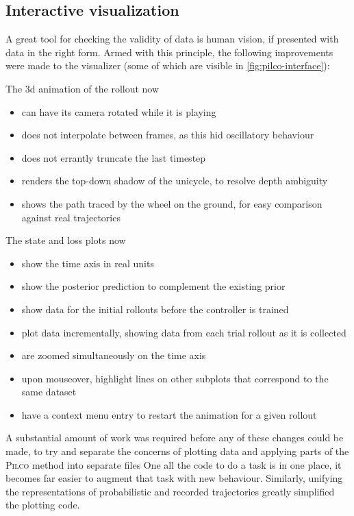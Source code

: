 \documentclass[main.tex]{subfiles}
\begin{document}
\subsection{Interactive visualization}

	A great tool for checking the validity of data is human vision, if presented with data in the right form.
	Armed with this principle, the following improvements were made to the visualizer (some of which are visible in \cref{fig:pilco-interface}):
	\begin{multicols}{2}
		\raggedcolumns
		\noindent
		The 3d animation of the rollout now
		\begin{itemize}[nosep]
			\item can have its camera rotated while it is playing
			\item does not interpolate between frames, as this hid oscillatory behaviour
			\item does not errantly truncate the last timestep
			\item renders the top-down shadow of the unicycle, to resolve depth ambiguity
			\item shows the path traced by the wheel on the ground, for easy comparison against real trajectories
		\end{itemize}
		\columnbreak
		\noindent
		The state and loss plots now
		\begin{itemize}[nosep]
			\item show the time axis in real units
			\item show the posterior prediction to complement the existing prior
			\item show data for the initial rollouts before the controller is trained
			\item plot data incrementally, showing data from each trial rollout as it is collected
			\item are zoomed simultaneously on the time axis
			\item upon mouseover, highlight lines on other subplots that correspond to the same dataset
			\item have a context menu entry to restart the animation for a given rollout
		\end{itemize}
	\end{multicols}

	A substantial amount of work was required before any of these changes could be made, to try and separate the concerns of plotting data and applying parts of the \textsc{Pilco} method into separate files
	One all the code to do a task is in one place, it becomes far easier to augment that task with new behaviour.
	Similarly, unifying the representations of probabilistic and recorded trajectories greatly simplified the plotting code.
\end{document}

